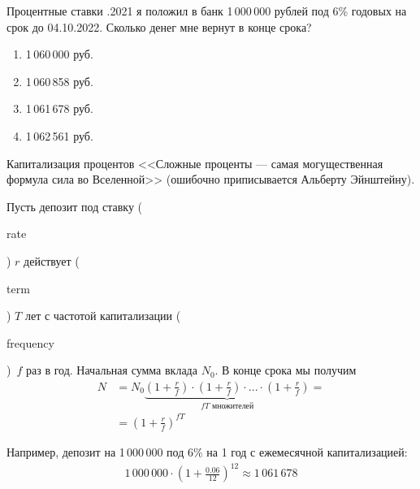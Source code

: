 \documentclass{beamer}
\newcommand{\en}[1]{\begin{otherlanguage}{english}#1\end{otherlanguage}}
\begin{document}
\begin{frame}{Процентные ставки}
.2021 я положил в банк 1\,000\,000 рублей под 6\% годовых на срок до 04.10.2022. Сколько денег мне вернут в конце срока?

\begin{enumerate}[label=\Alph*]
\item 1\,060\,000 руб. 
\item 1\,060\,858 руб. 
\item 1\,061\,678 руб. 
\item 1\,062\,561 руб. 
\end{enumerate}

\end{frame}


\begin{frame}{Капитализация процентов}
\justify
<<Сложные проценты --- самая могущественная формула сила во Вселенной>> (ошибочно приписывается Альберту Эйнштейну).

\justify
Пусть депозит под ставку (\en{rate}) $r$ действует (\en{term}) $T$ лет с частотой капитализации (\en{frequency})\ $f$ раз в год. Начальная сумма вклада $N_0$. В конце срока мы получим
\begin{align*}
N &= N_0\underbrace{\left(1 + \frac{r}{f}\right) \cdot \left(1 + \frac{r}{f}\right) \cdot ... \cdot \left(1 + \frac{r}{f}\right)}_{fT \text{\ множителей}} = \\
&= \left(1 + \frac{r}{f}\right)^{fT}
\end{align*}

Например, депозит на 1\,000\,000 под 6\% на 1 год с ежемесячной капитализацией:
\begin{align*}
1\,000\,000 \cdot \left(1 + \frac{0.06}{12}\right)^{12} \approx 1\,061\,678
\end{align*}
\end{frame}
\end{document}
